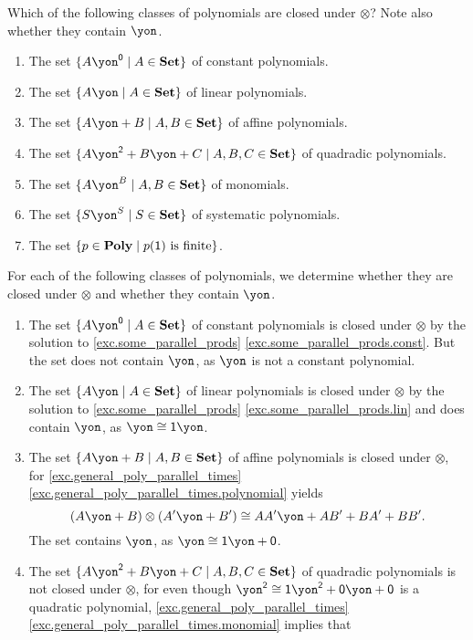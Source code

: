 \documentclass[Book-Poly]{subfiles}
\begin{document}
\begin{exercise}\label{exc.dir_closed_classes}
Which of the following classes of polynomials are closed under $\otimes$? Note also whether they contain $\yon$.
\begin{enumerate}
	\item The set $\{A\yon^\0\mid A\in\smset\}$ of constant polynomials.
	\item The set $\{A\yon\mid A\in\smset\}$ of linear polynomials.
	\item The set $\{A\yon+B\mid A,B\in\smset\}$ of affine polynomials.
	\item The set $\{A\yon^\2+B\yon+C\mid A,B,C\in\smset\}$ of quadradic polynomials.
	\item The set $\{A\yon^B\mid A,B\in\smset\}$ of monomials.
	\item The set $\{S\yon^S\mid S\in\smset\}$ of systematic polynomials.
	\item The set $\{p\in\mathbf{Poly}\mid p(\textsf{1})\text{ is finite}\}$. \qedhere
\end{enumerate}
\begin{solution}
For each of the following classes of polynomials, we determine whether they are closed under $\otimes$ and whether they contain $\yon$.
\begin{enumerate}
	\item The set $\{A\yon^\0\mid A\in\smset\}$ of constant polynomials is closed under $\otimes$ by the solution to \cref{exc.some_parallel_prods} \cref{exc.some_parallel_prods.const}.
	But the set does not contain $\yon$, as $\yon$ is not a constant polynomial.
	\item The set $\{A\yon\mid A\in\smset\}$ of linear polynomials is closed under $\otimes$ by the solution to \cref{exc.some_parallel_prods} \cref{exc.some_parallel_prods.lin} and does contain $\yon$, as $\yon \iso \1\yon$.
	\item The set $\{A\yon+B\mid A,B\in\smset\}$ of affine polynomials is closed under $\otimes$, for \cref{exc.general_poly_parallel_times} \cref{exc.general_poly_parallel_times.polynomial} yields
	\[
	    (A\yon + B) \otimes (A'\yon + B') \iso AA'\yon + AB' + BA' + BB'.
	\]
	The set contains $\yon$, as $\yon \iso \1\yon + \0 $.
	\item The set $\{A\yon^\2+B\yon+C\mid A,B,C\in\smset\}$ of quadradic polynomials is not closed under $\otimes$, for even though $\yon^\2 \iso \1\yon^\2 + \0\yon + \0$ is a quadratic polynomial, \cref{exc.general_poly_parallel_times} \cref{exc.general_poly_parallel_times.monomial} implies that
	\[
\]
\end{enumerate}
\end{solution}
\end{exercise}
\end{document}
